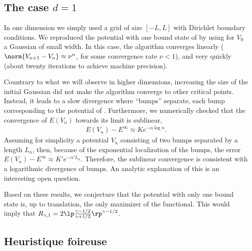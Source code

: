 \documentclass[10pt,a4paper,reqno]{amsart}
\begin{document}
\subsection{The case $d = 1$}
In one dimension we simply used a grid of size $[-L,L]$ with Dirichlet
boundary conditions. We reproduced the potential with one bound state
of \cite{lieb1976bound} by using for $V_{0}$ a Gaussian of small
width. In this case, the algorithm converges linearly (\ie $\norm{V_{n+1} -
V_{n}} \approx \nu^{n}$, for some convergence rate  $\nu < 1$), and very
quickly (about twenty iterations to achieve machine precision).

Countrary to what we will observe in higher dimensions, increasing the
size of the initial Gaussian did not make the algorithm converge to
other critical points. Instead, it leads to a slow divergence where
``bumps'' separate, each bump corresponding to the potential of
\cite{lieb1976bound}. Furthermore, we numerically checked that the
convergence of $E(V_{n})$ towards its limit is sublinear, \ie
\begin{align*}
  E(V_{n}) - E^{\infty} \approx K e^{- \alpha \log n}.
\end{align*}
Assuming for simplicity a potential $V_{n}$ consisting of two bumps
separated by a length $L_{n}$, then, because of the exponential
localization of the bumps, the error $E(V_{n}) - E^{\infty} \approx K'
e^{- \alpha' L_{n}}.$ Therefore, the sublinear convergence is
consistent with a logarithmic divergence of bumps. An analytic
explanation of this is an interesting open question.

Based on these results, we conjecture that the potential with only one
bound state is, up to translation, the only maximizer of the
functional. This would imply that $R_{\gamma,1} = 2 \lp
\frac{\gamma-1/2}{\gamma+1/2}\rp^{\gamma-1/2}$.

\subsection{Heuristique foireuse}
\end{document}
